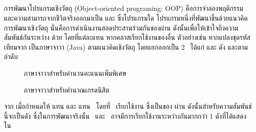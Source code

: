 {{\subsection{\FirstTimeDefine{\scg}{\scgEN}}

การพัฒนาโปรแกรมเชิงวัตถุ (Object-oriented programing: OOP) คือการจำลองพฤติกรรมและความสามารถจากชีวิตจริงออกมาเป็น
{\FirstTimeDefine{\class}{\classEN}} \FirstTimeDefine{\method}{\methodEN} 
และ{\FirstTimeDefine{\attribute}{\attributeEN}} \cite{kindler2011} ซึ่งโปรแกรมใด
โปรแกรมหนึ่งที่พัฒนาขึ้นด้วยแนวคิดการพัฒนาเชิงวัตถุ นั่นคือการดำเนินงานสอดประสานร่วมกันของ{\class}ผ่าน{\method} 
ดังนั้นเพื่อให้เข้าใจถึงความสัมพันธ์กันระหว่าง{\sourcecode} ด้วย{\scg} โดยที่แต่ละ{\Node}แทน{\class} 
หากคลาสเรียกใช้งาน{\method}ของ{\class}อื่น ตัวอย่างเช่น หากแปลงชุดรหัสเทียมจาก  
เป็น{\sourcecode}ภาษาจาวา (Java) ตามแนวคิดเชิงวัตถุ 
โดยแยกออกเป็น 2 \class\ ได้แก่  และ  ดัง 
และตามลำดับ

\begin{figure}[ht!]
    \lstset{style=thesiscodestyle}
    
    \caption{{\sourcecode}ภาษาจาวาสำหรับคำนวนคะแนนเพิ่มพิเศษ}
    \label{fig:javaBonusScore}
\end{figure}

\begin{figure}[ht!]
    \lstset{style=thesiscodestyle}
    
    \caption{{\sourcecode}ภาษาจาวาสำหรับคำนวณเกรดนิสิต}
    \label{fig:javaGrading}
\end{figure}


\clearpage
จาก เมื่อกำหนดให้  แทน{\class}  และ  
แทน\class\  โดยที่\class\  เรียกใช้งาน{\method}  
ซึ่งเป็น{\method}ของ{\class}  ผ่าน{\method} {} ดังนั้น{\scg}สำหรับความสัมพันธ์นี้จะเป็นดัง
{} ซึ่งในการพัฒนาจริงนั้น\class\  และ\class\ 
อาจมีการเรียกใช้งานระหว่างกันมากกว่า 1 \method ดังที่ได้แสดงใน{}

}}

